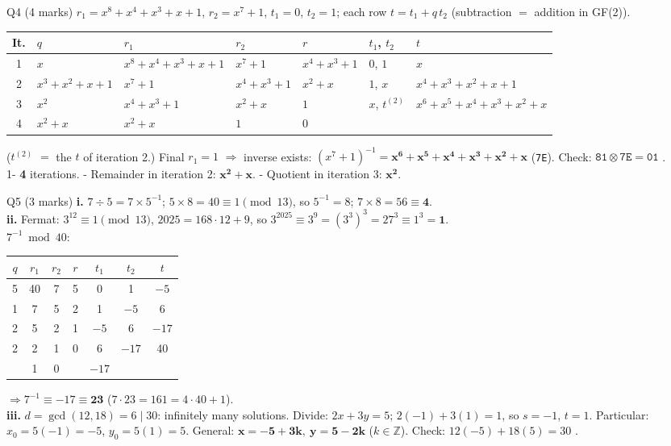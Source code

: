 \documentclass[11pt,a4paper]{article}
\newcommand{\ttx}[1]{\texttt{#1}}
\begin{document}
{\begin{sol}{Q4 (4 marks)}
$r_1 = x^8 + x^4 + x^3 + x + 1$, $r_2 = x^7 + 1$, $t_1 = 0$, $t_2 = 1$; each row $t = t_1 + q\,t_2$ (subtraction $=$ addition in GF(2)).
\begin{center}\footnotesize\setlength{\tabcolsep}{3pt}
\begin{tabular}{@{}cllllll@{}}
\toprule
It. & $q$ & $r_1$ & $r_2$ & $r$ & $t_1$, \;$t_2$ & $t$\\
\midrule
1 & $x$ & $x^8 + x^4 + x^3 + x + 1$ & $x^7 + 1$ & $x^4 + x^3 + 1$ & $0$, \;$1$ & $x$\\
2 & $x^3 + x^2 + x + 1$ & $x^7 + 1$ & $x^4 + x^3 + 1$ & $x^2 + x$ & $1$, \;$x$ & $x^4 + x^3 + x^2 + x + 1$\\
3 & $x^2$ & $x^4 + x^3 + 1$ & $x^2 + x$ & $1$ & $x$, \;$t^{(2)}$ & $x^6 + x^5 + x^4 + x^3 + x^2 + x$\\
4 & $x^2 + x$ & $x^2 + x$ & $1$ & $0$ & & \\
\bottomrule
\end{tabular}
\end{center}
($t^{(2)}$ $=$ the $t$ of iteration 2.) Final $r_1 = 1$ $\Rightarrow$ inverse exists: $(x^7 + 1)^{-1} = \mathbf{x^6 + x^5 + x^4 + x^3 + x^2 + x}$ (\ttx{7E}). Check: $\ttx{81} \otimes \ttx{7E} = \ttx{01}$ \checkmark.\\
1- \textbf{4} iterations. - Remainder in iteration 2: $\mathbf{x^2 + x}$. - Quotient in iteration 3: $\mathbf{x^2}$.
\end{sol}

\begin{sol}{Q5 (3 marks)}
\textbf{i.} $7 \div 5 = 7 \times 5^{-1}$; $5 \times 8 = 40 \equiv 1 \pmod{13}$, so $5^{-1} = 8$; $7 \times 8 = 56 \equiv \mathbf{4}$.\\
\textbf{ii.} Fermat: $3^{12} \equiv 1 \pmod{13}$, $2025 = 168 \cdot 12 + 9$, so $3^{2025} \equiv 3^9 = (3^3)^3 = 27^3 \equiv 1^3 = \mathbf{1}$.\\
$7^{-1} \bmod 40$: \;
\begin{tabular}[t]{@{}c|ccc|ccc@{}}
$q$ & $r_1$ & $r_2$ & $r$ & $t_1$ & $t_2$ & $t$\\\hline
5&40&7&5&0&1&$-5$\\ 1&7&5&2&1&$-5$&6\\ 2&5&2&1&$-5$&6&$-17$\\ 2&2&1&0&6&$-17$&40\\ &1&0&&$-17$&&\\
\end{tabular}
\;$\Rightarrow 7^{-1} \equiv -17 \equiv \mathbf{23}$ ($7 \cdot 23 = 161 = 4 \cdot 40 + 1$).\\
\textbf{iii.} $d = \gcd(12, 18) = 6 \mid 30$: infinitely many solutions. Divide: $2x + 3y = 5$; $2(-1) + 3(1) = 1$, so $s = -1$, $t = 1$. Particular: $x_0 = 5(-1) = -5$, $y_0 = 5(1) = 5$. General: $\mathbf{x = -5 + 3k,\ y = 5 - 2k}$ ($k \in \mathbb{Z}$). Check: $12(-5) + 18(5) = 30$ \checkmark.
\end{sol}

}
\end{document}
